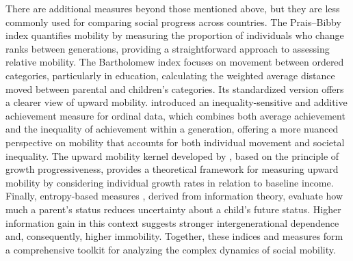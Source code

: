 There are additional measures beyond those mentioned above, but they are less commonly used for comparing social progress across countries. The Prais--Bibby index \citep{bibby1975methods, prais1955measuring} quantifies mobility by measuring the proportion of individuals who change ranks between generations, providing a straightforward approach to assessing relative mobility. The Bartholomew index \citep{Bartholomew1967} focuses on movement between ordered categories, particularly in education, calculating the weighted average distance moved between parental and children's categories. Its standardized version offers a clearer view of upward mobility. \citet{apouey2023ordinal} introduced an inequality-sensitive and additive achievement measure for ordinal data, which combines both average achievement and the inequality of achievement within a generation, offering a more nuanced perspective on mobility that accounts for both individual movement and societal inequality. The upward mobility kernel developed by \citet{ray2023measuring}, based on the principle of growth progressiveness, provides a theoretical framework for measuring upward mobility by considering individual growth rates in relation to baseline income. Finally, entropy-based measures \citep{mueller2021entropy}, derived from information theory, evaluate how much a parent's status reduces uncertainty about a child's future status. Higher information gain in this context suggests stronger intergenerational dependence and, consequently, higher immobility. Together, these indices and measures form a comprehensive toolkit for analyzing the complex dynamics of social mobility.


